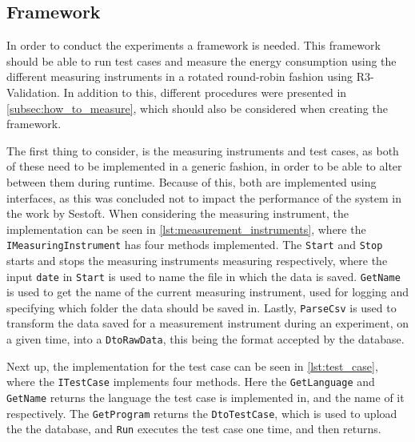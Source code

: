 \subsection{Framework}

In order to conduct the experiments a framework is needed. This framework should be able to run test cases and measure the energy consumption using the different measuring instruments in a rotated round-robin fashion using R3-Validation. In addition to this, different procedures were presented in \cref{subsec:how_to_measure}, which should also be considered when creating the framework.


The first thing to consider, is the measuring instruments and test cases, as both of these need to be implemented in a generic fashion, in order to be able to alter between them during runtime. Because of this, both are implemented using interfaces, as this was concluded not to impact the performance of the system in the work by Sestoft\cite[]{sestoft2013microbenchmarks}. When considering the measuring instrument, the implementation can be seen in \cref{lst:measurement_instruments}, where the \texttt{IMeasuringInstrument} has four methods implemented. The \texttt{Start} and \texttt{Stop} starts and stops the measuring instruments measuring respectively, where the input \texttt{date} in \texttt{Start} is used to name the file in which the data is saved. \texttt{GetName} is used to get the name of the current measuring instrument, used for logging and specifying which folder the data should be saved in. Lastly, \texttt{ParseCsv} is used to transform the data saved for a measurement instrument during an experiment, on a given time, into a \texttt{DtoRawData}, this being the format accepted by the database.



Next up, the implementation for the test case can be seen in \cref*{lst:test_case}, where the \texttt{ITestCase} implements four methods. Here the \texttt{GetLanguage} and \texttt{GetName} returns the language the test case is implemented in, and the name of it respectively. The \texttt{GetProgram} returns the \texttt{DtoTestCase}, which is used to upload the the database, and \texttt{Run} executes the test case one time, and then returns.



